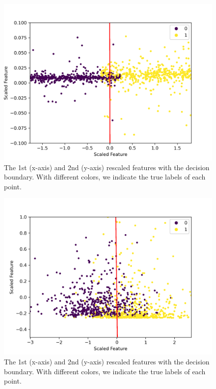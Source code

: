 \documentclass[a4paper,10pt]{article}
\begin{document}
\begin{figure}[H]
  \centering
  \includegraphics[width=.8\linewidth]{./plots/boundary_1-4.png}
  \caption{The 1st (x-axis) and 2nd (y-axis) rescaled features with the decision boundary. With different colors, we indicate the true labels of each point.}
  \label{fig:boun_1_4}
\end{figure}

\begin{figure}[H]
  \centering
  \includegraphics[width=.8\linewidth]{./plots/boundary_2-3.png}
  \caption{The 1st (x-axis) and 2nd (y-axis) rescaled features with the decision boundary. With different colors, we indicate the true labels of each point.}
  \label{fig:boun_2_3}
\end{figure}
\end{document}
